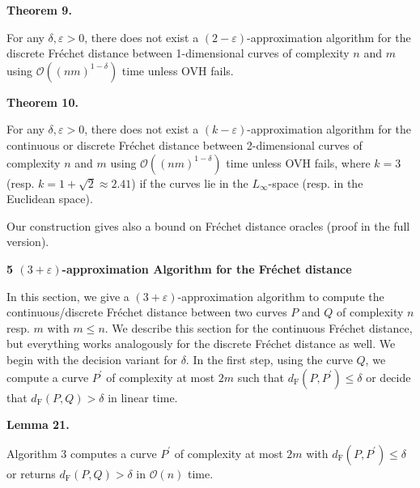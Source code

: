 \documentclass[10pt,a4paper]{article}
\begin{document}
\par\medskip\noindent\textbf{Theorem 9.}\par
For any $\delta,\varepsilon>0$, there does not exist a $(2-\varepsilon)$-approximation algorithm for the discrete Fréchet distance between 1-dimensional curves of complexity $n$ and $m$ using $\mathcal{O}((nm)^{1-\delta})$ time unless OVH fails.
\par
\par
\par

\par\medskip\noindent\textbf{Theorem 10.}\par
For any $\delta,\varepsilon>0$, there does not exist a $(k-\varepsilon)$-approximation algorithm for the continuous or discrete Fréchet distance between 2-dimensional curves of complexity $n$ and $m$ using $\mathcal{O}((nm)^{1-\delta})$ time unless OVH fails, where $k=3$ (resp. $k=1+\sqrt{2}\approx 2.41$) if the curves lie in the $L_{\infty}$-space (resp. in the Euclidean space).
\par
\par
\par
Our construction gives also a bound on Fréchet distance oracles (proof in the full version).
\par
\par
\par\medskip\noindent\textbf{5 $(3+\varepsilon)$-approximation Algorithm for the Fréchet distance}\par
In this section, we give a $(3+\varepsilon)$-approximation algorithm to compute the continuous/discrete Fréchet distance between two curves $P$ and $Q$ of complexity $n$ resp. $m$ with $m\leq n$. We describe this section for the continuous Fréchet distance, but everything works analogously for the discrete Fréchet distance as well. We begin with the decision variant for $\delta$. In the first step, using the curve $Q$, we compute a curve $P^{\prime}$ of complexity at most $2m$ such that $d_{\text{F}}(P,P^{\prime})\leq\delta$ or decide that $d_{\text{F}}(P,Q)>\delta$ in linear time.
\par
\par
\par\medskip\noindent\textbf{Lemma 21.}\par
Algorithm 3 computes a curve $P^{\prime}$ of complexity at most $2m$ with $d_{\text{F}}(P,P^{\prime})\leq\delta$ or returns $d_{\text{F}}(P,Q)>\delta$ in $\mathcal{O}(n)$ time.
\end{document}
